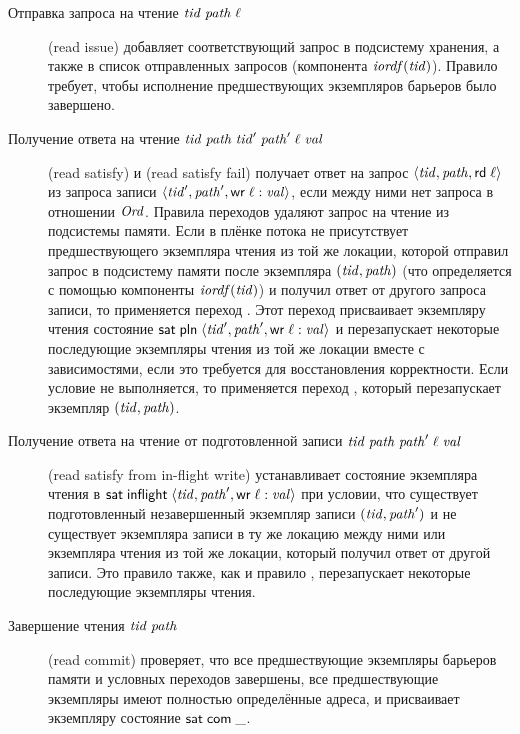 \begin{description}
\item[Отправка запроса на чтение $\mathit{tid} \; \mathit{path} \; \ell$] (read issue)
  добавляет соответствующий запрос в подсистему хранения, а также в список отправленных
  запросов (компонента $\mathit{iordf}(\mathit{tid})$).
  Правило требует, чтобы исполнение предшествующих экземпляров барьеров было завершено.

\item[Получение ответа на чтение $\mathit{tid} \; \mathit{path} \; \mathit{tid}' \; \mathit{path}' \; \ell \; \mathit{val}$]
  (read satisfy) и 
  (read satisfy fail)
получает ответ на запрос $\langle \mathit{tid}, \mathit{path}, {\sf rd} \; \ell \rangle$ из запроса записи
$\langle \mathit{tid}', \mathit{path}', {\sf wr} \; \ell:\mathit{val} \rangle$, если между ними нет запроса в отношении $\mathit{Ord}$.
Правила переходов удаляют запрос на чтение из подсистемы памяти.
Если в плёнке потока не присутствует предшествующего экземпляра чтения из той же локации,
которой отправил запрос в подсистему памяти после экземпляра $(\mathit{tid}, \mathit{path})$
(что определяется с помощью компоненты $\mathit{iordf}(\mathit{tid})$)
и получил ответ от другого запроса записи, то применяется переход
. Этот переход присваивает экземпляру чтения
состояние $\mathsf{sat} \; \mathsf{pln} \; \langle \mathit{tid}', \mathit{path}', {\sf wr} \; \ell:\mathit{val} \rangle$
и перезапускает некоторые последующие экземпляры чтения из той же локации вместе с зависимостями,
если это требуется для восстановления корректности.
Если условие не выполняется, то применяется переход ,
который перезапускает экземпляр $(\mathit{tid}, \mathit{path})$.

\item[Получение ответа на чтение от подготовленной записи
  $\mathit{tid} \; \mathit{path} \; \mathit{path}' \; \ell \; \mathit{val}$]
  (read satisfy from in-flight write)
устанавливает состояние экземпляра чтения в
$\mathsf{sat} \; \mathsf{inflight} \; \langle \mathit{tid}, \mathit{path}', {\sf wr} \; \ell:\mathit{val} \rangle$
при условии, что существует подготовленный незавершенный экземпляр записи $(\mathit{tid}, \mathit{path}')$
и не существует экземпляра записи в ту же локацию между ними или экземпляра чтения из той же
локации, который получил ответ от другой записи.
Это правило также, как и правило ,
перезапускает некоторые последующие экземпляры чтения.

\item[Завершение чтения $\mathit{tid} \; \mathit{path}$] (read commit)
  проверяет, что все предшествующие экземпляры барьеров памяти и условных переходов завершены,
  все предшествующие экземпляры имеют полностью определённые адреса, и
  присваивает экземпляру состояние $\mathsf{sat} \; \mathsf{com} \; \_$.
\end{description}

